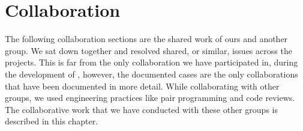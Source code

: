 
\chapter{Collaboration}

The following collaboration sections are the shared work of ours and another group. We sat down together and resolved shared, or similar, issues across the projects. This is far from the only collaboration we have participated in, during the development of \giraf, however, the documented cases are the only collaborations that have been documented in more detail. While collaborating with other groups, we used engineering practices like pair programming and code reviews. The collaborative work that we have conducted with these other groups is described in this chapter.




